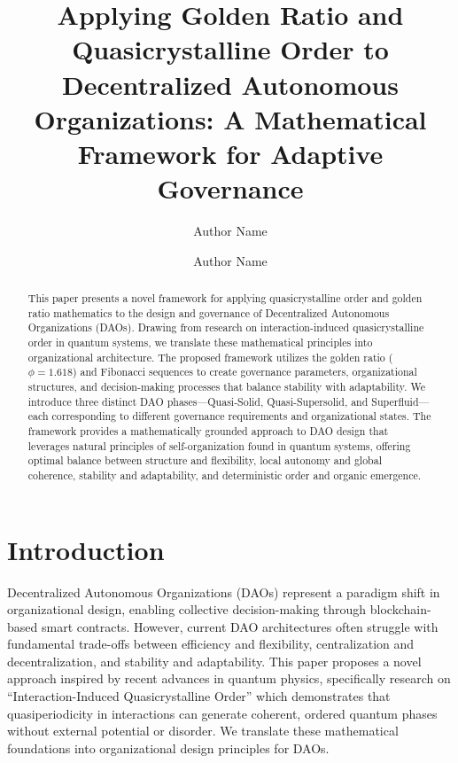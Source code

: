\documentclass[AMA]{WileyNJD-AMA}
\begin{document}
\title{Applying Golden Ratio and Quasicrystalline Order to Decentralized Autonomous Organizations: A Mathematical Framework for Adaptive Governance}

\author{%
    Author Name%
    \and
    Author Name
}


\begin{abstract}
This paper presents a novel framework for applying quasicrystalline order and golden ratio mathematics to the design and governance of Decentralized Autonomous Organizations (DAOs). Drawing from research on interaction-induced quasicrystalline order in quantum systems, we translate these mathematical principles into organizational architecture. The proposed framework utilizes the golden ratio ($\phi = 1.618$) and Fibonacci sequences to create governance parameters, organizational structures, and decision-making processes that balance stability with adaptability. We introduce three distinct DAO phases---Quasi-Solid, Quasi-Supersolid, and Superfluid---each corresponding to different governance requirements and organizational states. The framework provides a mathematically grounded approach to DAO design that leverages natural principles of self-organization found in quantum systems, offering optimal balance between structure and flexibility, local autonomy and global coherence, stability and adaptability, and deterministic order and organic emergence.
\end{abstract}


\maketitle

\section{Introduction}

Decentralized Autonomous Organizations (DAOs) represent a paradigm shift in organizational design, enabling collective decision-making through blockchain-based smart contracts. However, current DAO architectures often struggle with fundamental trade-offs between efficiency and flexibility, centralization and decentralization, and stability and adaptability. This paper proposes a novel approach inspired by recent advances in quantum physics, specifically research on ``Interaction-Induced Quasicrystalline Order'' which demonstrates that quasiperiodicity in interactions can generate coherent, ordered quantum phases without external potential or disorder. We translate these mathematical foundations into organizational design principles for DAOs.
\end{document}
